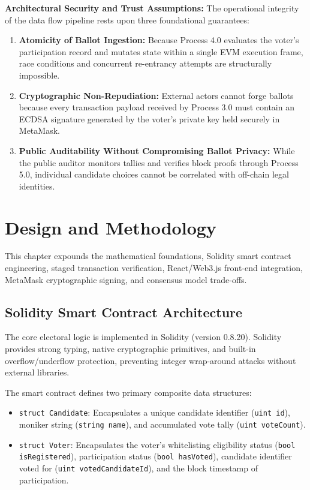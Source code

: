 \documentclass[12pt,a4paper]{report}
\begin{document}
\noindent\textbf{Architectural Security and Trust Assumptions:}
The operational integrity of the data flow pipeline rests upon three foundational guarantees:
\begin{enumerate}
    \setlength{\itemsep}{0pt}
    \setlength{\parskip}{0pt}
    \item \textbf{Atomicity of Ballot Ingestion:} Because Process 4.0 evaluates the voter's participation record and mutates state within a single EVM execution frame, race conditions and concurrent re-entrancy attempts are structurally impossible.
    \item \textbf{Cryptographic Non-Repudiation:} External actors cannot forge ballots because every transaction payload received by Process 3.0 must contain an ECDSA signature generated by the voter's private key held securely in MetaMask.
    \item \textbf{Public Auditability Without Compromising Ballot Privacy:} While the public auditor monitors tallies and verifies block proofs through Process 5.0, individual candidate choices cannot be correlated with off-chain legal identities.
\end{enumerate}

\chapter{Design and Methodology}

This chapter expounds the mathematical foundations, Solidity smart contract engineering, staged transaction verification, React/Web3.js front-end integration, MetaMask cryptographic signing, and consensus model trade-offs.

\section{Solidity Smart Contract Architecture}
The core electoral logic is implemented in Solidity (version 0.8.20). Solidity provides strong typing, native cryptographic primitives, and built-in overflow/underflow protection, preventing integer wrap-around attacks without external libraries.

The smart contract defines two primary composite data structures:
\begin{itemize}
    \item \texttt{struct Candidate}: Encapsulates a unique candidate identifier (\texttt{uint id}), moniker string (\texttt{string name}), and accumulated vote tally (\texttt{uint voteCount}).
    \item \texttt{struct Voter}: Encapsulates the voter's whitelisting eligibility status (\texttt{bool isRegistered}), participation status (\texttt{bool hasVoted}), candidate identifier voted for (\texttt{uint votedCandidateId}), and the block timestamp of participation.
\end{itemize}
\end{document}

